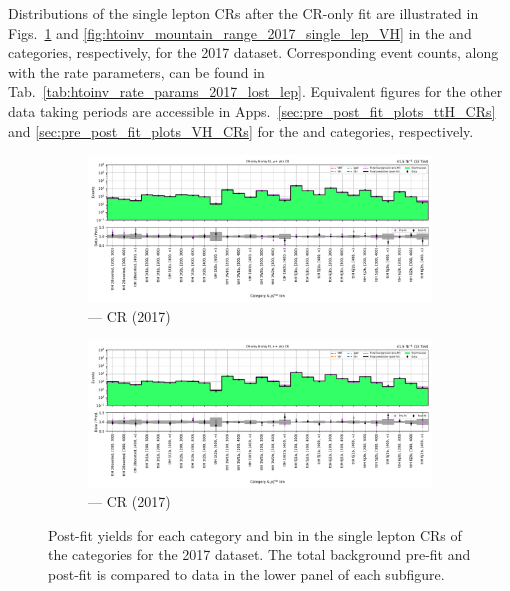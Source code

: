 Distributions of the single lepton \glspl{CR} after the \gls{CR}-only fit are illustrated in Figs.~\ref{fig:htoinv_mountain_range_2017_single_lep_ttH} and \ref{fig:htoinv_mountain_range_2017_single_lep_VH} in the \ttH and \VH categories, respectively, for the 2017 dataset. Corresponding event counts, along with the rate parameters, can be found in Tab.~\ref{tab:htoinv_rate_params_2017_lost_lep}. Equivalent figures for the other data taking periods are accessible in Apps.~\ref{sec:pre_post_fit_plots_ttH_CRs} and \ref{sec:pre_post_fit_plots_VH_CRs} for the \ttH and \VH categories, respectively.

\clearpage

\begin{figure}[htbp]
    \centering
    \begin{subfigure}[b]{\textwidth}
        \includegraphics[width=\textwidth]{chapters/higgstoinv/figures/mountain_ranges/2017/ttH/Wmunu_tree_fit_b-abs_values_ttH_cats.pdf}
        \caption{\ttH --- \singleMuCr \gls{CR} (2017)}
    \end{subfigure}

    \begin{subfigure}[b]{\textwidth}
        \includegraphics[width=\textwidth]{chapters/higgstoinv/figures/mountain_ranges/2017/ttH/Wenu_tree_fit_b-abs_values_ttH_cats.pdf}
        \caption{\ttH --- \singleEleCr \gls{CR} (2017)}
    \end{subfigure}
    \caption[Post-fit yields for each category and \ptmiss bin in the single lepton control regions of the \ttH categories for the 2017 dataset]{Post-fit yields for each category and \ptmiss bin in the single lepton \glspl{CR} of the \ttH categories for the 2017 dataset. The total background pre-fit and post-fit is compared to data in the lower panel of each subfigure.}
    \label{fig:htoinv_mountain_range_2017_single_lep_ttH}
\end{figure}

